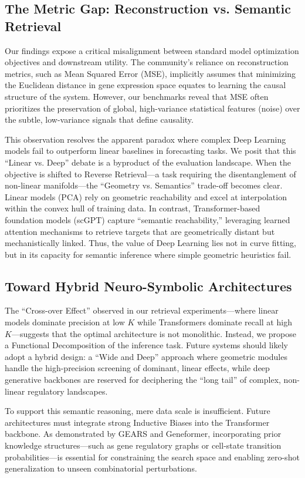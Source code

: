 \documentclass[conference]{IEEEtran}
\begin{document}
\subsection{The Metric Gap: Reconstruction vs. Semantic Retrieval}
Our findings expose a critical misalignment between standard model optimization objectives and downstream utility. The community's reliance on reconstruction metrics, such as Mean Squared Error (MSE), implicitly assumes that minimizing the Euclidean distance in gene expression space equates to learning the causal structure of the system. However, our benchmarks reveal that MSE often prioritizes the preservation of global, high-variance statistical features (noise) over the subtle, low-variance signals that define causality.

This observation resolves the apparent paradox where complex Deep Learning models fail to outperform linear baselines in forecasting tasks. We posit that this ``Linear vs. Deep'' debate is a byproduct of the evaluation landscape. When the objective is shifted to Reverse Retrieval—a task requiring the disentanglement of non-linear manifolds—the ``Geometry vs. Semantics'' trade-off becomes clear. Linear models (PCA) rely on geometric reachability and excel at interpolation within the convex hull of training data. In contrast, Transformer-based foundation models (scGPT) capture ``semantic reachability,'' leveraging learned attention mechanisms to retrieve targets that are geometrically distant but mechanistically linked. Thus, the value of Deep Learning lies not in curve fitting, but in its capacity for semantic inference where simple geometric heuristics fail.

\subsection{Toward Hybrid Neuro-Symbolic Architectures}
The ``Cross-over Effect'' observed in our retrieval experiments—where linear models dominate precision at low $K$ while Transformers dominate recall at high $K$—suggests that the optimal architecture is not monolithic. Instead, we propose a Functional Decomposition of the inference task. Future systems should likely adopt a hybrid design: a ``Wide and Deep'' approach where geometric modules handle the high-precision screening of dominant, linear effects, while deep generative backbones are reserved for deciphering the ``long tail'' of complex, non-linear regulatory landscapes.

To support this semantic reasoning, mere data scale is insufficient. Future architectures must integrate strong Inductive Biases into the Transformer backbone. As demonstrated by GEARS and Geneformer, incorporating prior knowledge structures—such as gene regulatory graphs or cell-state transition probabilities—is essential for constraining the search space and enabling zero-shot generalization to unseen combinatorial perturbations.
\end{document}
